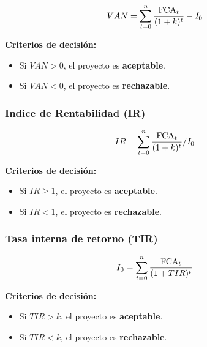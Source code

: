 \documentclass{templateNote}
\begin{document}
\begin{align*}
    VAN &= \sum_{t=0}^{n} \frac{\textnormal{FCA}_t}{(1+k)^t} - I_0
\end{align*}

\textbf{Criterios de decisión:}
\begin{itemize}
    \item Si $VAN > 0$, el proyecto es \textbf{aceptable}.
    \item Si $VAN < 0$, el proyecto es \textbf{rechazable}.
\end{itemize}

\subsubsection*{Indice de Rentabilidad (IR)}

\begin{align*}
    IR &= \sum_{t=0}^{n} \frac{\textnormal{FCA}_t}{(1+k)^t}/I_0
\end{align*}

\textbf{Criterios de decisión:}
\begin{itemize}
    \item Si $IR \geq 1$, el proyecto es \textbf{aceptable}.
    \item Si $IR < 1$, el proyecto es \textbf{rechazable}.
\end{itemize}

\subsubsection*{Tasa interna de retorno (TIR)}

\begin{align*}
    I_0 &= \sum_{t=0}^{n} \frac{\textnormal{FCA}_t}{(1+TIR)^t}
\end{align*}

\textbf{Criterios de decisión:}
\begin{itemize}
    \item Si $TIR > k$, el proyecto es \textbf{aceptable}.
    \item Si $TIR < k$, el proyecto es \textbf{rechazable}.
\end{itemize}
\end{document}
